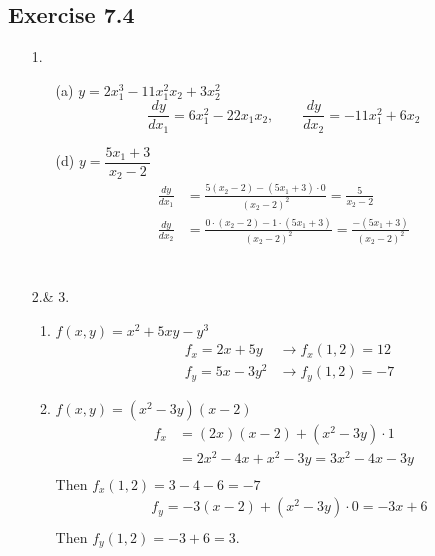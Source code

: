 \documentclass{./../../Latex/homework}
\begin{document}
\subsection*{Exercise 7.4} 
\begin{enumerate}

\item[1.] 
\begin{enumerate}
\item[(a)]  $y=2 x_{1}^{3}-11 x_{1}^{2} x_{2}+3 x_{2}^{2} $
$$
\frac{d y}{d x_{1}}=6 x_{1}^{2}-22 x_{1} x_{2}, \quad  \quad 
\frac{d y}{d x_{2}}=-11 x_{1}^{2}+6 x_{2} $$ 
\item[(d)]  $ y=\dfrac{5 x_{1}+3}{x_{2}-2}$ \\
$$
\begin{aligned} \frac{d y}{d x_{1}} &=\frac{5\left(x_{2}-2\right)-\left(5 x_{1}+3\right) \cdot 0}{\left(x_{2}-2\right)^{2}}=\frac{5}{x_{2}-2} \\
\frac{d y}{d x_{2}} & = \frac{0 \cdot (x_2-2)-1 \cdot (5x_1+3)}{(x_{2}-2)^2}= \frac{ -(5x_1+3)}{(x_{2}-2)^2} \\
\end{aligned}
$$ \\
\end{enumerate}

\item[2.\& 3.] 
\begin{enumerate}
\item $f(x, y)=x^{2}+5 x y-y^{3}$
$$
\begin{aligned}
&f_{x}=2 x+5 y & \rightarrow f_{x}(1,2)=12 \\
&f_{y}=5 x-3 y^{2} & \rightarrow f_{y}(1,2)=-7
\end{aligned}
$$ 
\item $f(x, y)=\left(x^{2}-3 y\right)(x-2)$
$$
\begin{aligned}
f_{x} &=(2 x)(x-2)+\left(x^{2}-3 y\right) \cdot 1 \\
&=2 x^{2}-4 x+x^{2}-3 y=3 x^{2}-4 x-3 y \\
\end{aligned}
$$
Then $f_{x}(1,2)=3-4-6=-7$
$$
\begin{aligned}
&f_{y}=-3(x-2)+\left(x^{2}-3 y\right) \cdot 0=-3 x+6 \\
\end{aligned}
$$
Then $f_{y}(1,2)=-3+6=3$. \\
\end{enumerate}


\end{enumerate}
\end{document}
